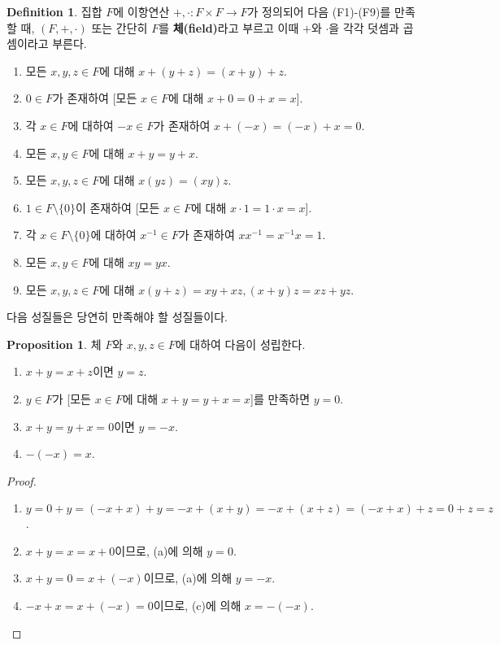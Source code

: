 \documentclass[11pt]{book}
\numberwithin{equation}{chapter}
\theoremstyle{definition}
\newtheorem{prop}[thm]{Proposition}
\newtheorem{defn}[thm]{Definition}
\begin{document}
    \begin{defn}
        집합 \(F\)에 이항연산 \(+, \cdot: F \times F \to F\)가 정의되어 다음 (F1)-(F9)를 만족할 때, \((F, +, \cdot)\) 또는 간단히 \(F\)를 \textbf{체(field)}라고 부르고 이때 \(+\)와 \(\cdot\)을 각각 덧셈과 곱셈이라고 부른다.
        \begin{enumerate} [label=(F\arabic*), leftmargin=2\parindent]
			\item
			모든 \(x, y, z \in F\)에 대해 \(x + (y+z) = (x+y)+z\).
			\item
			\(0 \in F\)가 존재하여 [모든 \(x \in F\)에 대해 \(x+0=0+x=x\)].
			\item
			각 \(x \in F\)에 대하여 \(-x \in F\)가 존재하여 \(x+(-x)=(-x)+x=0\).
			\item
			모든 \(x, y \in F\)에 대해 \(x+y=y+x\).
			\item
			모든 \(x, y, z \in F\)에 대해 \(x(yz)=(xy)z\).
			\item
			\(1 \in F \setminus \{0\}\)이 존재하여 [모든 \(x \in F\)에 대해 \(x\cdot 1=1 \cdot x=x\)].
			\item
			각 \(x \in F \setminus \{0\}\)에 대하여 \(x^{-1} \in F\)가 존재하여 \(xx^{-1}=x^{-1}x=1\).
			\item
			모든 \(x, y \in F\)에 대해 \(xy=yx\).
			\item
			모든 \(x, y, z \in F\)에 대해 \(x(y+z)=xy+xz, (x+y)z = xz+yz\).
		\end{enumerate}
    \end{defn}

다음 성질들은 당연히 만족해야 할 성질들이다.

\begin{prop} \label{prop 1.1.3}
    체 \(F\)와 \(x, y, z \in F\)에 대하여 다음이 성립한다.
    \begin{enumerate} [label=(\alph*), leftmargin=2\parindent]
        \item
        \(x + y = x + z\)이면 \(y = z\).
        \item
        \(y \in F\)가 [모든 \(x \in F\)에 대해 \(x + y = y + x = x\)]를 만족하면 \(y = 0\).
        \item
        \(x + y = y + x = 0\)이면 \(y = -x\).
        \item
        \(-(-x) = x\).
    \end{enumerate}
\end{prop}
\begin{proof} \quad


    \begin{enumerate} [label=(\alph*), leftmargin=2\parindent]
        \item
        \(y = 0 + y = (-x + x) + y = -x + (x + y) = -x + (x + z) = (-x + x) + z = 0 + z = z\).
        \item
        \(x + y = x = x + 0\)이므로, (a)에 의해 \(y=0\).
        \item
        \(x + y = 0 = x + (-x)\)이므로, (a)에 의해 \(y = -x\).
        \item
        \(-x + x = x + (-x) = 0\)이므로, (c)에 의해 \(x = -(-x)\).
    \end{enumerate}
\end{proof}
\end{document}
